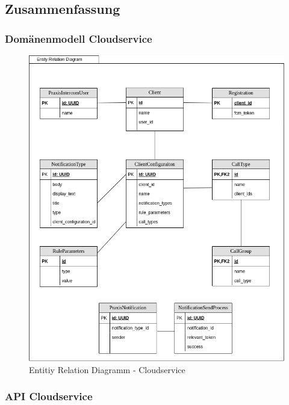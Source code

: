 \subsection{Zusammenfassung}

\subsubsection*{Domänenmodell Cloudservice}

\begin{figure}[h]
    \centering
    \begin{minipage}[b]{0.9\textwidth}
        \includegraphics[width=\textwidth]{graphics/diagramms/erd_v02}
        \caption{Entitiy Relation Diagramm - Cloudservice}
    \end{minipage}
\end{figure}

\clearpage

\subsubsection*{API Cloudservice}

